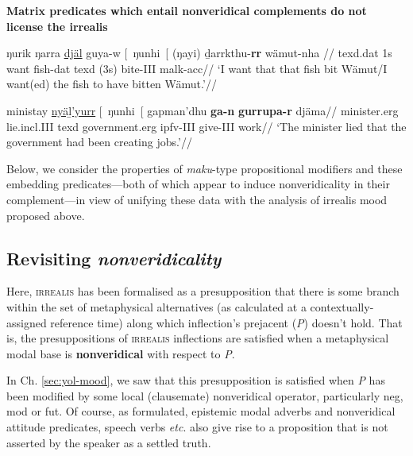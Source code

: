 \pex{} \textbf{Matrix predicates which entail nonveridical complements do not license the irrealis}\par\nobreak
\a\begingl\gla ŋurik ŋarra \ul{djäl} guya-w \textup{[}~ŋunhi~\textup{[} (ŋayi)  ḏarrkthu-\textbf{rr} wämut-nha \nogloss{\textup{]]}}//
\glb \gls{texd}.\gls{dat} 1s want fish-\gls{dat} \gls{texd} (3s) bite-\gls{III} \gls{malk}-\gls{acc}//
\glft`I want that that fish bit Wämut/I want(ed) the fish to have bitten Wämut.'//\endgl

\a\begingl\gla ministay \ul{nyäḻ'yurr} \textup{[}~ŋunhi~\textup{[} gapman'dhu \textbf{ga-n} \textbf{gurrupa-r} djäma//
\glb minister.\gls{erg} lie.\gls{incl}.\gls{III} \gls{texd} government.\gls{erg} \gls{ipfv}-\gls{III} give-\gls{III} work//
\glft`The minister lied that the government had been creating jobs.'\trailingcitation{[AW~20190428]}//\endgl
\xe

Below, we consider the properties of \textit{maku}-type propositional modifiers and these embedding predicates---both of which appear to induce nonveridicality in their complement---in view of unifying these data with the analysis of irrealis mood proposed above.


\subsection{Revisiting \textit{nonveridicality}}



Here, \textsc{irrealis} has been formalised as a presupposition that there is some branch within the set of metaphysical alternatives (as calculated at a contextually-assigned reference time) along which inflection's prejacent (\textit{P}) doesn't hold. That is, the presuppositions of \textsc{irrealis} inflections are satisfied when a metaphysical modal base is \textbf{nonveridical} with respect to \textit{P}.

In Ch. \ref{sec:yol-mood}, we saw that this presupposition is satisfied when \textit{P} has been modified by some local (clausemate) nonveridical operator, particularly \gls{neg}, \gls{mod} or \gls{fut}. Of course, as formulated, epistemic modal adverbs and nonveridical attitude predicates, speech verbs \textit{etc}. also give rise to a proposition that is not asserted by the speaker as a settled truth.

